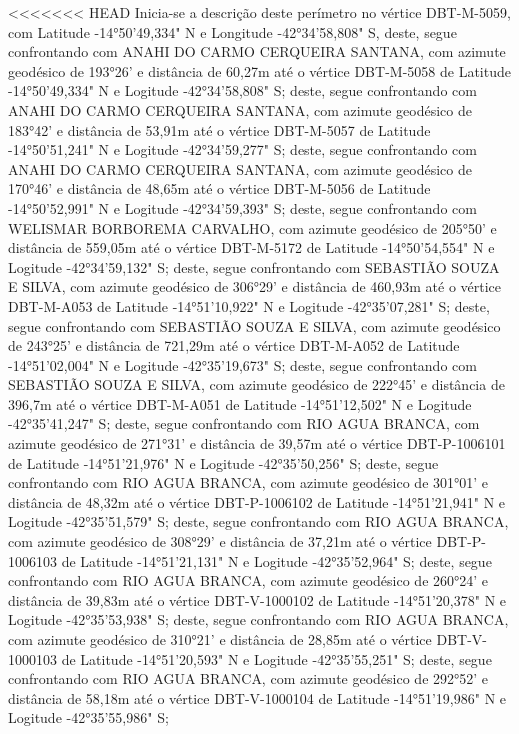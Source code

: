 <<<<<<< HEAD
Inicia-se a descrição deste perímetro no vértice DBT-M-5059, 
com Latitude -14°50'49,334" N e Longitude -42°34'58,808" S, deste, segue confrontando com ANAHI DO CARMO CERQUEIRA SANTANA, com azimute geodésico de 193°26' e distância de 
60,27m até o vértice DBT-M-5058 de Latitude -14°50'49,334" N e Logitude -42°34'58,808" S;
deste, segue confrontando com ANAHI DO CARMO CERQUEIRA SANTANA, com azimute geodésico de 183°42' e distância de 
53,91m até o vértice DBT-M-5057 de Latitude -14°50'51,241" N e Logitude -42°34'59,277" S;
deste, segue confrontando com ANAHI DO CARMO CERQUEIRA SANTANA, com azimute geodésico de 170°46' e distância de 
48,65m até o vértice DBT-M-5056 de Latitude -14°50'52,991" N e Logitude -42°34'59,393" S;
deste, segue confrontando com WELISMAR BORBOREMA CARVALHO, com azimute geodésico de 205°50' e distância de 
559,05m até o vértice DBT-M-5172 de Latitude -14°50'54,554" N e Logitude -42°34'59,132" S;
deste, segue confrontando com SEBASTIÃO SOUZA E SILVA, com azimute geodésico de 306°29' e distância de 
460,93m até o vértice DBT-M-A053 de Latitude -14°51'10,922" N e Logitude -42°35'07,281" S;
deste, segue confrontando com SEBASTIÃO SOUZA E SILVA, com azimute geodésico de 243°25' e distância de 
721,29m até o vértice DBT-M-A052 de Latitude -14°51'02,004" N e Logitude -42°35'19,673" S;
deste, segue confrontando com SEBASTIÃO SOUZA E SILVA, com azimute geodésico de 222°45' e distância de 
396,7m até o vértice DBT-M-A051 de Latitude -14°51'12,502" N e Logitude -42°35'41,247" S;
deste, segue confrontando com RIO AGUA BRANCA, com azimute geodésico de 271°31' e distância de 
39,57m até o vértice DBT-P-1006101 de Latitude -14°51'21,976" N e Logitude -42°35'50,256" S;
deste, segue confrontando com RIO AGUA BRANCA, com azimute geodésico de 301°01' e distância de 
48,32m até o vértice DBT-P-1006102 de Latitude -14°51'21,941" N e Logitude -42°35'51,579" S;
deste, segue confrontando com RIO AGUA BRANCA, com azimute geodésico de 308°29' e distância de 
37,21m até o vértice DBT-P-1006103 de Latitude -14°51'21,131" N e Logitude -42°35'52,964" S;
deste, segue confrontando com RIO AGUA BRANCA, com azimute geodésico de 260°24' e distância de 
39,83m até o vértice DBT-V-1000102 de Latitude -14°51'20,378" N e Logitude -42°35'53,938" S;
deste, segue confrontando com RIO AGUA BRANCA, com azimute geodésico de 310°21' e distância de 
28,85m até o vértice DBT-V-1000103 de Latitude -14°51'20,593" N e Logitude -42°35'55,251" S;
deste, segue confrontando com RIO AGUA BRANCA, com azimute geodésico de 292°52' e distância de 
58,18m até o vértice DBT-V-1000104 de Latitude -14°51'19,986" N e Logitude -42°35'55,986" S;

